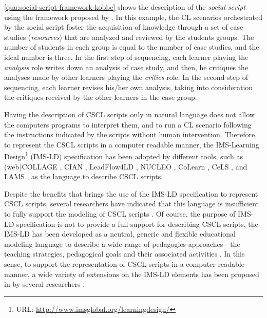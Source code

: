 \autoref{qua:social-script-framework-kobbe} shows the description of the \emph{social script} \cite{WeinbergerErtlFischerMandl2005} using the framework proposed by .
In this example, the CL scenarios orchestrated by the social script foster the acquisition of knowledge through a set of case studies (\emph{resources}) that are analyzed and reviewed by the students groups.
The number of students in each group is equal to the number of case studies, and the ideal number is three.
In the first step of sequencing, each learner playing the \emph{analysis} role writes down an analysis of case study, and then, he critiques the analyses made by other learners playing the \emph{critics} role.
In the second step of sequencing, each learner revises his/her own analysis, taking into consideration the critiques received by the other learners in the case group.

Having the description of CSCL scripts only in natural language does not allow the computers programs to interpret them, and to run a CL scenario following the instructions indicated by the scripts without human intervention.
Therefore, to represent the CSCL scripts in a computer readable manner, the IMS-Learning Design\footnote{URL: \url{http://www.imsglobal.org/learningdesign/}} (IMS-LD) specification has been adopted by different tools, such as (web)COLLAGE \cite{Hernandez-LeoVillasclaras-FernandezAsensio-PerezDimitriadisJorrin-AbellanRuiz-RequiesRubia-Avi2006,Villasclaras-FernandezHernandez-LeoAsensio-PerezDimitriadis2013}, CIAN \cite{MolinaRedondoOrtega2012}, LeadFlow4LD \cite{Palomino-RamirezBote-LorenzoAsensio-PerezDimitriadis2008}, NUCLEO \cite{SanchoFuentes-FernandezFernandez-Manjon2008}, CoLearn \cite{StylianakisArapiMoumoutzisChristodoulakis2013}, CeLS \cite{RonenKohen-Vacs2009}, and LAMS \cite{Romero-MorenoOrtegaTroyano2007}, as the language to describe CSCL scripts.
 
Despite the benefits that brings the use of the IMS-LD specification to represent CSCL scripts, several researchers have indicated that this language is insufficient to fully support the modeling of CSCL scripts \cite{AlharbiAthaudaChiong2014, CaeiroAnidoLlamas2003}.
Of course, the purpose of IMS-LD specification is not to provide a full support for describing CSCL scripts, the IMS-LD has been developed as a neutral, generic and flexible educational modeling language to describe a wide range of pedagogies approaches - the teaching strategies, pedagogical goals and their associated activities \cite{Koper2005}.
In this sense, to support the representation of CSCL scripts in a computer-readable manner, a wide variety of extensions on the IMS-LD elements has been proposed in by several researchers \cite{Bote-LorenzoVaquero-GonzalezVega-GorgojoDimitriadisAsensio-PerezGomez-SanchezHernandez-Leo2004, LeoPerezDimitriadis2004, MagnisalisDemetriadis2012, MiaoHoeksemaHoppeHarrer2005, Vega-GorgojoBote-LorenzoGomez-SanchezDimitriadisAsensio-Perez2005}.

